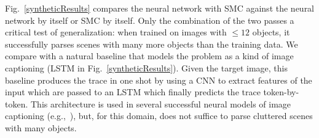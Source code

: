 \documentclass{article}
\begin{document}
Fig.~\ref{syntheticResults}
compares the neural network with SMC against the neural network by
itself or SMC by itself.  Only the combination of the two passes a
critical test of generalization: when trained on images with $\leq 12$
objects, it successfully parses scenes with many more objects than the
training data.
We compare with a natural baseline that models the problem as a kind of image captioning (LSTM in Fig.~\ref{syntheticResults}).
Given the target image, this baseline produces the trace in one shot by
using a CNN to extract features of the input which are passed to an LSTM which finally predicts
the trace token-by-token.
This architecture is used in several successful neural models of image captioning (e.g.,~\cite{vinyals2015show}),
but, for this domain, does not suffice to parse cluttered scenes with many objects.
\end{document}
